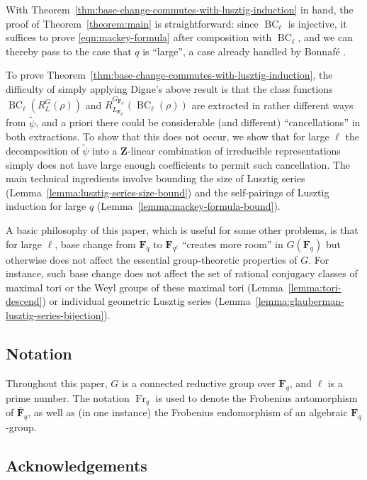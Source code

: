 \documentclass[11pt,reqno]{amsart}
\theoremstyle{definition}
\newcommand{\F}{{\mathbf F}}
\newcommand{\Z}{{\mathbf Z}}
\DeclareMathOperator{\BC}{BC}
\DeclareMathOperator{\Fr}{Fr}
\newcommand{\ol}[1]{\overline{#1}}
\begin{document}
With Theorem~\ref{thm:base-change-commutes-with-lusztig-induction} in hand, the proof of Theorem~\ref{theorem:main} is straightforward: since $\BC_\ell$ is injective, it suffices to prove \eqref{eqn:mackey-formula} after composition with $\BC_\ell$, and we can thereby pass to the case that $q$ is ``large'', a case already handled by Bonnaf\'e \cite[Th\'eor\`eme 5.1.1]{Bon98}.

To prove Theorem~\ref{thm:base-change-commutes-with-lusztig-induction}, the difficulty of simply applying Digne's above result is that the class functions $\BC_\ell(R_L^G(\rho))$ and $R_{L_{\F_{q^\ell}}}^{G_{\F_{q^\ell}}}(\BC_\ell(\rho))$ are extracted in rather different ways from $\widetilde\psi$, and a priori there could be considerable (and different) ``cancellations'' in both extractions. To show that this does not occur, we show that for large $\ell$ the decomposition of $\widetilde\psi$ into a $\Z$-linear combination of irreducible representations simply does not have large enough coefficients to permit such cancellation. The main technical ingredients involve bounding the size of Lusztig series (Lemma~\ref{lemma:lusztig-series-size-bound}) and the self-pairings of Lusztig induction for large $q$ (Lemma~\ref{lemma:mackey-formula-bound}).

A basic philosophy of this paper, which is useful for some other problems, is that for large $\ell$, base change from $\F_q$ to $\F_{q^\ell}$ ``creates more room'' in $G(\F_q)$ but otherwise does not affect the essential group-theoretic properties of $G$. For instance, such base change does not affect the set of rational conjugacy classes of maximal tori or the Weyl groups of these maximal tori (Lemma~\ref{lemma:tori-descend}) or individual geometric Lusztig series (Lemma~\ref{lemma:glauberman-lusztig-series-bijection}).

\subsection{Notation}

Throughout this paper, $G$ is a connected reductive group over $\F_q$, and $\ell$ is a prime number. The notation $\Fr_q$ is used to denote the Frobenius automorphism of $\ol\F_q$, as well as (in one instance) the Frobenius endomorphism of an algebraic $\F_q$-group.

\subsection{Acknowledgements}
\end{document}
